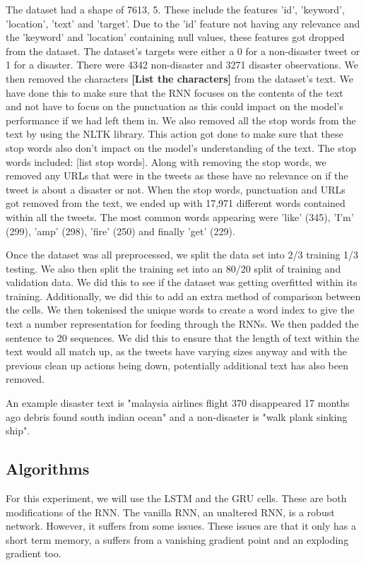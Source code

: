 \documentclass[a4paper,10pt]{article}
\begin{document}
	The dataset had a shape of 7613, 5. These include the features 'id', 'keyword', 'location', 'text' and 'target'. Due to the 'id' feature not having any relevance and the 'keyword' and 'location' containing null values, these features got dropped from the dataset. The dataset's targets were either a 0 for a non-disaster tweet or 1 for a disaster. There were 4342 non-disaster and 3271 disaster observations.
	We then removed the characters \textbf{[List the characters]} from the dataset's text. We have done this to make sure that the RNN focuses on the contents of the text and not have to focus on the punctuation as this could impact on the model's performance if we had left them in. We also removed all the stop words from the text by using the NLTK library. This action got done to make sure that these stop words also don't impact on the model's understanding of the text. The stop words included: [list stop words]. Along with removing the stop words, we removed any URLs that were in the tweets as these have no relevance on if the tweet is about a disaster or not. When the stop words, punctuation and URLs got removed from the text, we ended up with 17,971 different words contained within all the tweets. The most common words appearing were 'like' (345), 'I'm' (299), 'amp' (298), 'fire' (250) and finally 'get' (229).
	
	Once the dataset was all preprocessed, we split the data set into 2/3 training 1/3 testing. We also then split the training set into an 80/20 split of training and validation data. We did this to see if the dataset was getting overfitted within its training. Additionally, we did this to add an extra method of comparison between the cells. We then tokenised the unique words to create a word index to give the text a number representation for feeding through the RNNs. We then padded the sentence to 20 sequences. We did this to ensure that the length of text within the text would all match up, as the tweets have varying sizes anyway and with the previous clean up actions being down, potentially additional text has also been removed.   
	
	An example disaster text is "malaysia airlines flight 370 disappeared 17 months ago debris found south indian ocean" and a non-disaster is "walk plank sinking ship".

\subsection{Algorithms}
	For this experiment, we will use the LSTM and the GRU cells. These are both modifications of the RNN. The vanilla RNN, an unaltered RNN, is a robust network. However, it suffers from some issues. These issues are that it only has a short term memory, a suffers from a vanishing gradient point and an exploding gradient too.
	
\end{document}

